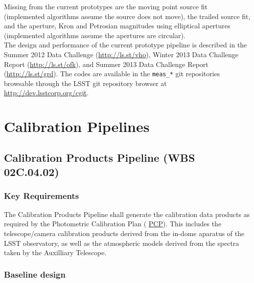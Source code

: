 \documentclass[12pt]{article}
\newcommand{\ds}[2]{{\color{blue} \href{https://docushare.lsstcorp.org/docushare/dsweb/Get/#1}{#2}}\xspace}
\newcommand{\PCP}{\ds{Document-8123}{PCP}}
\newcommand{\wbsCPP}{WBS 02C.04.02}
\begin{document}
Missing from the current prototypes are the moving point source fit (implemented algorithms assume the source does not move), the trailed source fit, and the aperture, Kron and Petrosian magnitudes using elliptical apertures (implemented algorithms assume the apertures are circular).
\\

The design and performance of the current prototype pipeline is described in the Summer 2012 Data Challenge (\url{http://ls.st/vho}), Winter 2013 Data Challenge Report (\url{http://ls.st/ofk}), and Summer 2013 Data Challenge Report (\url{http://ls.st/grd}). The codes are available in the {\tt meas\_*} git repositories browsable through the LSST git repository browser at \url{http://dev.lsstcorp.org/cgit}.

\clearpage

\section{Calibration Pipelines}

\subsection{Calibration Products Pipeline (\wbsCPP)}

\subsubsection{Key Requirements}

The Calibration Products Pipeline shall generate the calibration data products as required by the Photometric Calibration Plan (\PCP). This includes the telescope/camera calibration products derived from the in-dome aparatus of the LSST observatory, as well as the atmospheric models derived from the spectra taken by the Auxilliary Telescope.

\subsubsection{Baseline design}
\end{document}
